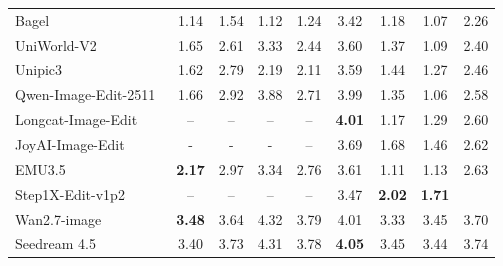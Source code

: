 \begin{table}[t]
{\begin{tabular}{l|cccc|cccc}
            Bagel~\cite{deng2025emerging}
            & 1.14 & 1.54 & 1.12 & \cellcolor[HTML]{C8C8C8}1.24 & 3.42 & 1.18 & 1.07 
            & \cellcolor[HTML]{C8C8C8}2.26 \\

            UniWorld-V2~\cite{li2025uniworld}
            & 1.65 & 2.61 & 3.33 & \cellcolor[HTML]{C8C8C8}2.44 & 3.60 & 1.37 & 1.09
            & \cellcolor[HTML]{C8C8C8}2.40 \\

            Unipic3~\cite{wei2026skywork}
            & 1.62 & 2.79 & 2.19 & \cellcolor[HTML]{C8C8C8}2.11 & 3.59 & 1.44 & 1.27
            & \cellcolor[HTML]{C8C8C8}2.46 \\

            Qwen-Image-Edit-2511~\cite{wu2025qwen}
            & 1.66 & 2.92 & 3.88 & \cellcolor[HTML]{C8C8C8}2.71 & 3.99 & 1.35 & 1.06
            & \cellcolor[HTML]{C8C8C8}2.58 \\
            
            Longcat-Image-Edit~\cite{team2025longcat}
            & -- & -- & -- & --
            & \color[HTML]{F88825}\textbf{4.01} & 1.17 & 1.29
            & \cellcolor[HTML]{C8C8C8}2.60 \\

            JoyAI-Image-Edit~\cite{joyaiimageedit}
            & - & - & - & --
            & 3.69 & 1.68 & 1.46
            & \cellcolor[HTML]{C8C8C8}2.62 \\

            EMU3.5~\cite{cui2025emu3}
            & \color[HTML]{F88825}\textbf{2.17} & 2.97 & 3.34 & \cellcolor[HTML]{C8C8C8}2.76 & 3.61 & 1.11 & 1.13
            & \cellcolor[HTML]{C8C8C8}2.63 \\


            Step1X-Edit-v1p2~\cite{liu2025step1x}
            & -- & -- & -- & --
            & 3.47 & \color[HTML]{F88825}\textbf{2.02} & \color[HTML]{F88825}\textbf{1.71}
            & \cellcolor[HTML]{C8C8C8}{\color[HTML]{F88825}\textbf{2.66}} \\

     

    
            \midrule

            Wan2.7-image~\cite{nanobananapro}
            &  \color[HTML]{319B62}\textbf{3.48} & 3.64 & 4.32 & \cellcolor[HTML]{C8C8C8}3.79 & 4.01 & 3.33 & 3.45
            & \cellcolor[HTML]{C8C8C8} 3.70 \\
            
            Seedream 4.5~\cite{seedream2025seedream}
            & 3.40 & 3.73 & 4.31 & \cellcolor[HTML]{C8C8C8}3.78 & \color[HTML]{319B62}\textbf{4.05} & 3.45 & 3.44
            & \cellcolor[HTML]{C8C8C8} 3.74 \\


\end{tabular}}
\end{table}
